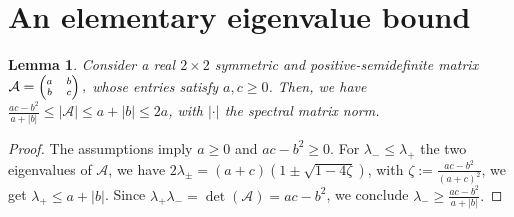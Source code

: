 \documentclass{amsart}
\newtheorem{lemma}[theorem]{Lemma}
\theoremstyle{definition}
\theoremstyle{remark}
\numberwithin{equation}{section}
\begin{document}
\appendix
\section{An elementary eigenvalue bound}
 \begin{lemma}\label{eigen_est}
 	Consider a real $2\times 2$ symmetric and positive-semidefinite matrix $\scriptsize\mathcal{A}=\begin{pmatrix}
 		a & b \\
 		b & c
 	\end{pmatrix},
 $ whose entries satisfy
$a,c\ge0$. Then, we have $
\frac{ac-b^2}{a+|b|}\le |\mathcal{A}| \le a+|b|\le 2a$, with $|\cdot|$ the spectral matrix norm.
 \end{lemma}
 \begin{proof}
 	The assumptions imply $a\ge 0$ and $ac-b^2\ge 0$. For $\lambda_-\le \lambda_{+}$ the two eigenvalues of $\mathcal{A}$, we have
 	$
 	2\lambda_{\pm}
 	=(a+c )(1 \pm \sqrt{1-4\zeta})
 	$,
 	with $\zeta:=\frac{ac-b^2}{(a+c)^2}$, we get $\lambda_{+} \le a+|b|$.  Since $\lambda_{+}\lambda_-=\det (\mathcal{A})=ac-b^2$, we conclude
 	$
 	\lambda_-\ge \frac{ac-b^2}{a+|b|}.
 	$
 \end{proof}


\end{document}
